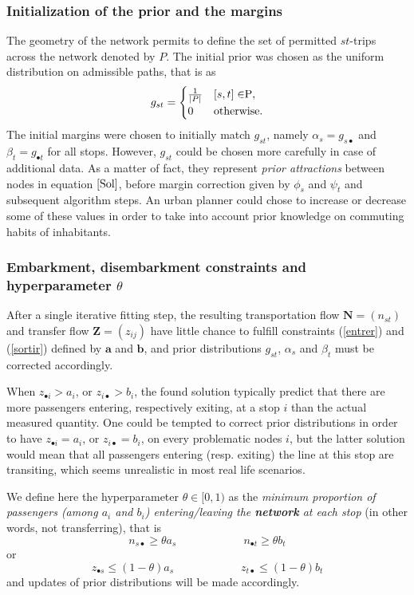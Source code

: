 \documentclass{bmcart}
\begin{document}
\subsubsection{Initialization of the prior and the margins}
The geometry of the network permits to define the set of permitted $st$-trips across the network denoted by $P$. The initial prior was chosen as the uniform distribution on admissible paths, that is as
\begin{equation*}
g_{st} = \begin{cases}
  \frac{1}{\vert P \vert}    & [s, t] \in $P$, \\
  0    & \text{otherwise}.
\end{cases}
\end{equation*}
The initial margins were chosen to initially match $g_{st}$, namely $\alpha_s=g_{s \bullet}$ and $\beta_t=g_{\bullet t}$ for all stops. However, $g_{st}$ could be chosen more carefully in case of additional data. As a matter of fact, they represent \emph{prior attractions} between nodes in equation $\ref{Sol}$, before margin correction given by $\phi_s$ and $\psi_t$ and subsequent algorithm steps. An urban planner could chose to increase or decrease some of these values in order to take into account prior knowledge on commuting habits of inhabitants.

\subsubsection{Embarkment, disembarkment constraints and hyperparameter $\theta$}
\label{constraints}
After a single iterative fitting step, the resulting transportation flow $\mathbf{N}=(n_{st})$ and transfer flow $\mathbf{Z}=(z_{ij})$ have little chance to fulfill constraints (\ref{entrer}) and (\ref{sortir}) defined by $\mathbf{a}$ and $\mathbf{b}$, and prior distributions $g_{st}$, $\alpha_s$ and $\beta_t$ must be corrected accordingly.

When $z_{\bullet i} > a_i$, or $z_{i \bullet} > b_i$, the found solution typically predict that there are more passengers entering, respectively exiting, at a stop $i$ than the actual measured quantity. One could be tempted to correct prior distributions in order to have $z_{\bullet i} = a_i$, or $z_{i \bullet} = b_i$, on every problematic nodes $i$, but the latter solution would mean that all passengers entering (resp. exiting) the line at this stop are transiting, which seems unrealistic in most real life scenarios.

We define here the hyperparameter $ \theta\in [0, 1)$ as the \emph{minimum proportion of passengers (among $a_i$ and $b_i$) entering/leaving the \textbf{network} at each stop} (in other words, not transferring), that is
\begin{equation}
n_{s\bullet}\ge \theta a_s \qquad\qquad \qquad n_{\bullet t}\ge \theta b_t
\end{equation}
or 
\begin{equation}
	z_{\bullet s} \le (1 - \theta) a_s\qquad\qquad \qquad z_{t \bullet} \le  (1 - \theta) b_t
\end{equation}
and updates of prior distributions will be made accordingly.
\end{document}
